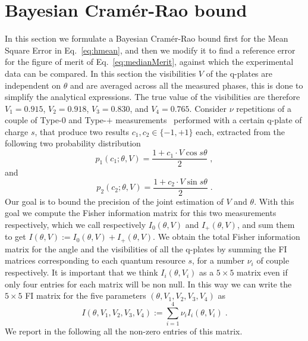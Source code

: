 \documentclass[aps, pra, 10pt, twocolumn, superscriptaddress,floatfix]{revtex4-1}
\begin{document}
\section{Bayesian Cramér-Rao bound}
%
In this section we formulate a Bayesian Cramér-Rao bound first for the Mean Square Error in Eq.~\eqref{eq:hmean}, and then we modify it to find a reference error for the figure of merit of Eq.~\eqref{eq:medianMerit}, against which the experimental data can be compared. In this section the visibilities $V$ of the q-plates are independent on $\theta$ and are averaged across all the measured phases, this is done to simplify the analytical expressions. The true value of the visibilities are therefore $V_1 = 0.915$, $V_2 = 0.918$, $V_3 = 0.830$, and $V_4 = 0.765$. Consider $\nu$ repetitions of a couple of Type-$0$ and Type-$+$ measurements~\cite{Belliardo2020} performed with a certain q-plate of charge $s$, that produce two results $c_1, c_2 \in \lbrace -1, +1 \rbrace$ each, extracted from the following two probability distribution
%
\begin{equation}
p_1(c_1; \theta, V) = \frac{1 + c_1 \cdot V \cos s \theta}{2} \; ,
\end{equation}
%
and 
%
\begin{equation}
p_2(c_2; \theta, V) = \frac{1 + c_2 \cdot V \sin s \theta}{2} \; .
\end{equation}
%
Our goal is to bound the precision of the joint estimation of $V$ and $\theta$. With this goal we compute the Fisher information matrix for this two measurements respectively, which we call respectively $I_0 (\theta, V)$ and $I_+ (\theta, V)$, and sum them to get $I(\theta, V) := I_0 (\theta, V) + I_+ (\theta, V)$. We obtain the total Fisher information matrix for the angle and the visibilities of all the q-plates by summing the FI matrices corresponding to each quantum resource $s$, for a number $\nu_i$ of couple respectively. It is important that we think $I_i (\theta, V_i)$ as a $5 \times 5$ matrix even if only four entries for each matrix will be non null. In this way we can write the $5 \times 5$ FI matrix for the five parameters $(\theta, V_1, V_2, V_3, V_4)$ as
%
\begin{equation}
I(\theta, V_1, V_2, V_3, V_4) := \sum_{i=1}^4 \nu_i I_i (\theta, V_i) \; .
\end{equation}
%
We report in the following all the non-zero entries of this matrix.
%
\end{document}
